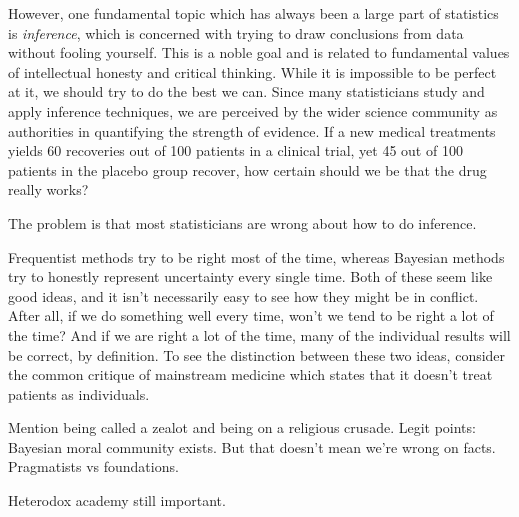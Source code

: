 \documentclass[a4paper, 12pt]{article}
\begin{document}
However, one fundamental topic which has always been a large part of
statistics is {\em inference}, which is concerned with trying to
draw conclusions from data without fooling yourself. This is a noble goal
and is related to fundamental values of intellectual honesty and critical
thinking. While
it is impossible to be perfect at it, we should try to do the best
we can. Since many statisticians study and apply inference techniques,
we are perceived by the wider science community as authorities
in quantifying the strength of evidence. If a new medical treatments yields 60
recoveries out of 100 patients in a clinical trial, yet 45 out of 100 patients
in the placebo group recover, how certain should we be that the drug really works?



The problem is that most statisticians are wrong about how to do inference.

Frequentist methods try to be right most of the time, whereas Bayesian methods
try to honestly represent uncertainty every single time. Both of these seem
like good ideas, and it isn't necessarily easy to see how they might be in
conflict. After all, if we do something well every time, won't we tend to be
right a lot of the time? And if we are right a lot of the time, many of the
individual results will be correct, by definition.
To see the distinction between these two ideas,
consider the common critique of mainstream medicine which states that it
doesn't treat patients as individuals.


Mention being called a zealot and being on a religious crusade.
Legit points: Bayesian moral community exists. But that doesn't mean we're
wrong on facts. Pragmatists vs foundations.

Heterodox academy still important.
\end{document}
